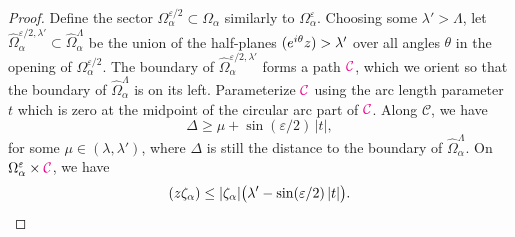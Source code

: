 \documentclass{article}
\let\Re\relax
\DeclareMathOperator{\Re}{Re}
\theoremstyle{definition}
\theoremstyle{plain}
\begin{document}
\begin{proof}
Define the sector $\Omega_\alpha^{\varepsilon/2} \subset \Omega_\alpha$ similarly to $\Omega_\alpha^\varepsilon$. Choosing some $\lambda' > \Lambda$, let $\widehat{\Omega}_\alpha^{\varepsilon/2, \lambda'} \subset \widehat{\Omega}_\alpha^\Lambda$ be the union of the half-planes $\Re(e^{i\theta} z) > \lambda'$ over all angles $\theta$ in the opening of $\Omega_\alpha^{\varepsilon/2}$. The boundary of $\widehat{\Omega}_\alpha^{\varepsilon/2, \lambda'}$ forms a path $\textcolor{magenta}{\mathcal{C}}$, which we orient so that the boundary of $\widehat{\Omega}_\alpha^\Lambda$ is on its left. Parameterize $\textcolor{magenta}{\mathcal{C}}$ using the arc length parameter $t$ which is zero at the midpoint of the circular arc part of $\textcolor{magenta}{\mathcal{C}}$. Along $\mathcal{C}$, we have
\[ \Delta \ge \mu + \sin(\varepsilon/2)\,|t|, \]
for some $\mu \in (\lambda, \lambda')$, where $\Delta$ is still the distance to the boundary of $\widehat{\Omega}_\alpha^\Lambda$. On $\Omega_\alpha^\varepsilon \times \textcolor{magenta}{\mathcal{C}}$, we have
\[ \Re(z\zeta_\alpha) \le |\zeta_\alpha| \big(\lambda' - \sin(\varepsilon/2)\,|t|\big). \]




\end{proof}
\end{document}
